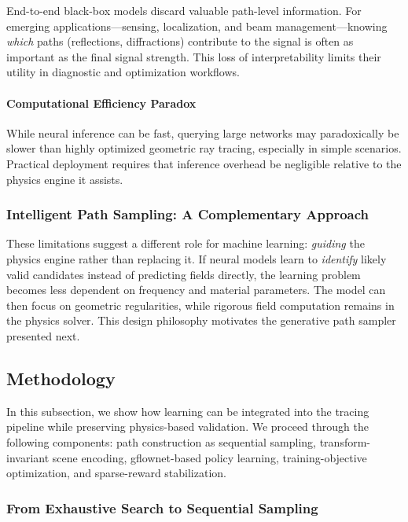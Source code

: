 End-to-end black-box models discard valuable path-level information. For emerging applications---sensing, localization, and beam management---knowing \emph{which} paths (reflections, diffractions) contribute to the signal is often as important as the final signal strength. This loss of interpretability limits their utility in diagnostic and optimization workflows.

\paragraph{Computational Efficiency Paradox}

While neural inference can be fast, querying large networks may paradoxically be slower than highly optimized geometric ray tracing, especially in simple scenarios. Practical deployment requires that inference overhead be negligible relative to the physics engine it assists.

\subsubsection{Intelligent Path Sampling: A Complementary Approach}

These limitations suggest a different role for machine learning: \emph{guiding} the physics engine rather than replacing it. If neural models learn to \emph{identify} likely valid candidates instead of predicting fields directly, the learning problem becomes less dependent on frequency and material parameters. The model can then focus on geometric regularities, while rigorous field computation remains in the physics solver. This design philosophy motivates the generative path sampler presented next.

\subsection{Methodology}

In this subsection, we show how learning can be integrated into the tracing pipeline while preserving physics-based validation. We proceed through the following components: path construction as sequential sampling, transform-invariant scene encoding, \gls{gflownet}-based policy learning, training-objective optimization, and sparse-reward stabilization.

\subsubsection{From Exhaustive Search to Sequential Sampling}

